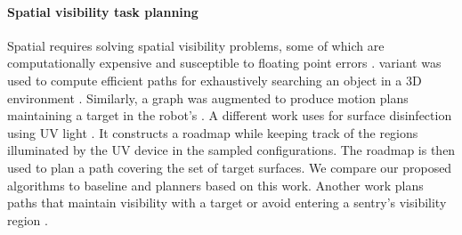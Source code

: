 \paragraph*{Spatial visibility task planning} 
Spatial \vistamp requires solving spatial visibility problems, some of which are computationally expensive and susceptible to floating point errors \cite{d-3dvasa-99}.  
 \prm variant was used to compute efficient paths for exhaustively searching an object in a 3D environment \cite{smh-sbccrfo3de-05}. %
Similarly, a \prm graph was augmented to produce motion plans maintaining a target in the robot's \fov \cite{blcl-ppivuprm-10}. A different work uses \prm for surface disinfection using UV light \cite{mrph-ocpuvsd-21}. It constructs a roadmap while keeping track of the regions illuminated by the UV device in the sampled configurations. The roadmap is then used to plan a path covering the set of target surfaces. We compare our proposed algorithms to baseline \prm and \rrt planners based on this work.  Another work plans paths that maintain visibility with a target or avoid entering a sentry's visibility region \cite{pld-prpmpsvr-24}. 






